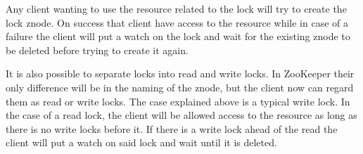 Any client wanting to use the resource related to the lock will try to create the lock znode. On success that client have access to the resource while in case of a failure the client will put a watch on the lock and wait for the existing znode to be deleted before trying to create it again.

It is also possible to separate locks into read and write locks. In ZooKeeper their only difference will be in the naming of the znode, but the client now can regard them as read or write locks. The case explained above is a typical write lock. In the case of a read lock, the client will be allowed access to the resource as long as there is no write locks before it. If there is a write lock ahead of the read the client will put a watch on said lock and wait until it is deleted. 






 
